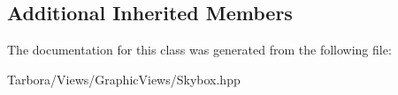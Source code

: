 \subsection*{Additional Inherited Members}


The documentation for this class was generated from the following file\+:\begin{DoxyCompactItemize}
\item 
Tarbora/\+Views/\+Graphic\+Views/Skybox.\+hpp\end{DoxyCompactItemize}
